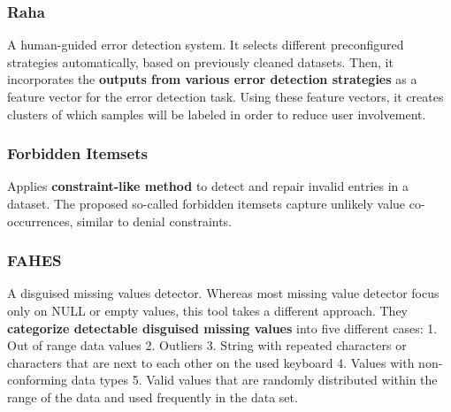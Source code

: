 \subsubsection{Raha \cite{Mahdavi2019-zf}}
A human-guided error detection system. It selects different preconfigured strategies automatically, based on previously cleaned datasets. Then, it incorporates the \textbf{outputs from various error detection strategies} as a feature vector for the error detection task. Using these feature vectors, it creates clusters of which samples will be labeled in order to reduce user involvement.

\subsubsection{Forbidden Itemsets \cite{Rammelaere2019-ea}}
Applies \textbf{constraint-like method} to detect and repair invalid entries in a dataset. The proposed so-called forbidden itemsets capture unlikely value co-occurrences, similar to denial constraints.

\subsubsection{FAHES \cite{Qahtan2018-te}}
A disguised missing values detector. Whereas most missing value detector focus only on NULL or empty values, this tool takes a different approach. They \textbf{categorize detectable disguised missing values} into five different cases: 1. Out of range data values 2. Outliers 3. String with repeated characters or characters that are next to each other on the used keyboard 4. Values with non-conforming data types 5. Valid values that are randomly distributed within the range of the data and used frequently in the data set.


